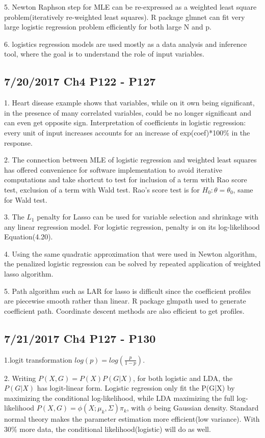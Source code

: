\documentclass[a4paper, 12pt]{article}
\begin{document}
5. Newton Raphson step for MLE can be re-expressed as a weighted least square problem(iteratively re-weighted least squares). R package glmnet can fit very large logistic regression problem efficiently for both large N and p.

6. logistics regression models are used mostly as a data analysis and inference tool, where the goal is to understand the role of input variables.

\subsection*{7/20/2017 Ch4 P122 - P127}

1. Heart disease example shows that variables, while on it own being significant, in the presence of many correlated variables, could be no longer significant and can even get opposite sign. Interpretation of coefficients in logistic regression: every unit of input increases accounts for an increase of exp(coef)*100\% in the response.

2. The connection between MLE of logistic regression and weighted least squares has offered convenience for software implementation to avoid iterative computations and take shortcut to test for inclusion of a term with Rao score test, exclusion of a term with Wald test. Rao's score test is for $H_0: \theta=\theta_0$, same for Wald test.

3. The $L_1$ penalty for Lasso can be used for variable selection and shrinkage with any linear regression model. For logistic regression, penalty is on its log-likelihood Equation(4.20).

4. Using the same quadratic approximation that were used in Newton algorithm, the penalized logistic regression can be solved by repeated application of weighted lasso algorithm.

5. Path algorithm such as LAR for lasso is difficult since the coefficient profiles are piecewise smooth rather than linear. R package glmpath used to generate coefficient path. Coordinate descent methods are also efficient to get profiles. 

\subsection*{7/21/2017 Ch4 P127 - P130}

1.logit transformation $log(p)=log(\frac{p}{1-p})$.

2. Writing $P(X,G)=P(X)P(G|X)$, for both logistic and LDA, the$P(G|X)$  has logit-linear form. Logistic regression only fit the P(G|X) by maximizing the conditional log-likelihood, while LDA maximizing the full log-likelihood $P(X,G)=\phi(X;\mu_k,\Sigma)\pi_k$, with $\phi$ being Gaussian density. Standard normal theory makes the parameter estimation more efficient(low variance). With $30\%$ more data, the conditional likelihood(logistic) will do as well.
\end{document}
